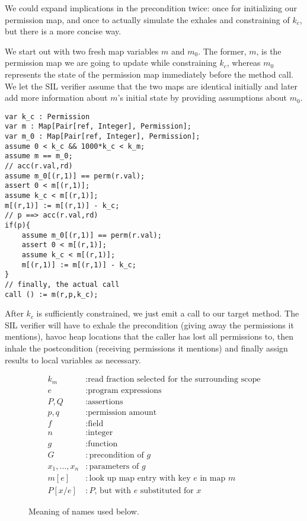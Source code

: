 We could expand implications in the precondition twice: once for initializing our permission map, and once to actually simulate the exhales and constraining of $k_c$, but there is a more concise way.

We start out with two fresh map variables $m$ and $m_0$. The former, $m$, is the permission map we are going to update while constraining $k_c$, whereas $m_0$ represents the state of the permission map immediately before the method call. 
We let the SIL verifier assume that the two maps are identical initially and later add more information about $m$'s initial state by providing assumptions about $m_0$.

\begin{lstlisting}[language=sil,float,caption={Translation sketch for a method call involving fractional read permissions and the precondition \lstinline:acc(r.val,rd) && p ==> acc(r.val):},label=lst:rdcall]
var k_c : Permission
var m : Map[Pair[ref, Integer], Permission];
var m_0 : Map[Pair[ref, Integer], Permission];
assume 0 < k_c && 1000*k_c < k_m;
assume m == m_0;
// acc(r.val,rd)
assume m_0[(r,1)] == perm(r.val);
assert 0 < m[(r,1)];
assume k_c < m[(r,1)];
m[(r,1)] := m[(r,1)] - k_c;
// p ==> acc(r.val,rd)
if(p){
	assume m_0[(r,1)] == perm(r.val);
	assert 0 < m[(r,1)];
	assume k_c < m[(r,1)];
	m[(r,1)] := m[(r,1)] - k_c;
}
// finally, the actual call
call () := m(r,p,k_c);
\end{lstlisting}

After $k_c$ is sufficiently constrained, we just emit a call to our target method. 
The SIL verifier will have to 
	exhale the precondition (giving away the permissions it mentions), 
	havoc heap locations that the caller has lost all permissions to, 
	then inhale the postcondition (receiving permissions it mentions) 
	and finally assign results to local variables as necessary.

\begin{figure}
\begin{align*}
	k_m &: \text{read fraction selected for the surrounding scope} \\
	e &: \text{program expressions} \\
	P,Q &: \text{assertions} \\
	p,q 	&: \text{permission amount} \\
	f 	&: \text{field} \\
	n 	&: \text{integer} \\
	g 	&: \text{function} \\
	G 	&: \text{precondition of $g$} \\
	x_1,\dotsc,x_n &: \text{parameters of $g$} \\
	m[e] &: \text{look up map entry with key $e$ in map $m$} \\
	P[x/e] &: \text{$P$, but with $e$ substituted for $x$}
\end{align*}
\caption{Meaning of names used below.}
\end{figure}

